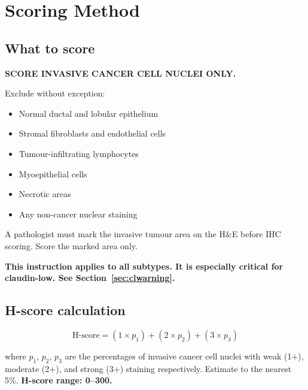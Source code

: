 \documentclass[11pt, a4paper]{article}
\begin{document}
\section{Scoring Method}
\label{sec:scoring}

\subsection{What to score}

\begin{mdframed}[backgroundcolor=scorebox,
                 linecolor=purple!50!black,
                 linewidth=1.5pt]
\textbf{SCORE INVASIVE CANCER CELL NUCLEI ONLY.}

Exclude without exception:
\begin{itemize}[noitemsep]
    \item Normal ductal and lobular epithelium
    \item Stromal fibroblasts and endothelial
    cells
    \item Tumour-infiltrating lymphocytes
    \item Myoepithelial cells
    \item Necrotic areas
    \item Any non-cancer nuclear staining
\end{itemize}

A pathologist must mark the invasive tumour
area on the H\&E before IHC scoring.
Score the marked area only.

\textbf{This instruction applies to all
subtypes. It is especially critical for
claudin-low. See
Section~\ref{sec:clwarning}.}
\end{mdframed}

\subsection{H-score calculation}

\begin{equation}
\text{H-score} =
(1 \times p_1) + (2 \times p_2) +
(3 \times p_3)
\end{equation}

where $p_1$, $p_2$, $p_3$ are the percentages
of invasive cancer cell nuclei with weak
(1$+$), moderate (2$+$), and strong (3$+$)
staining respectively. Estimate to the nearest
5\%. \textbf{H-score range: 0--300.}
\end{document}
